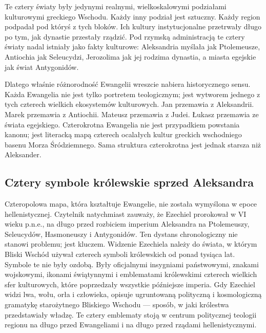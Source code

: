 Te cztery światy były jedynymi realnymi, wielkoskalowymi podziałami kulturowymi greckiego Wschodu.
Każdy inny podział jest sztuczny.
Każdy region podpadał pod któryś z tych bloków.
Ich kultury instytucjonalne przetrwały długo po tym, jak dynastie przestały rządzić.
Pod rzymską administracją te cztery światy nadal istniały jako fakty kulturowe: Aleksandria myślała jak Ptolemeusze, Antiochia jak Seleucydzi, Jerozolima jak jej rodzima dynastia, a miasta egejskie jak świat Antygonidów.

Dlatego właśnie różnorodność Ewangelii wreszcie nabiera historycznego sensu.
Każda Ewangelia nie jest tylko portretem teologicznym; jest wytworem jednego z tych czterech wielkich ekosystemów kulturowych.
Jan przemawia z Aleksandrii.
Marek przemawia z Antiochii.
Mateusz przemawia z Judei.
Łukasz przemawia ze świata egejskiego.
Czterokrotna Ewangelia nie jest przypadkiem powstania kanonu; jest literacką mapą czterech ocalałych kultur greckich wschodniego basenu Morza Śródziemnego.
Sama struktura czterokrotna jest jednak starsza niż Aleksander.

\subsection{Cztery symbole królewskie sprzed Aleksandra}

Czteropolowa mapa, która kształtuje Ewangelie, nie została wymyślona w epoce hellenistycznej.
Czytelnik natychmiast zauważy, że Ezechiel prorokował w VI wieku p.n.e., na długo przed rozbiciem imperium Aleksandra na Ptolemeuszy, Seleucydów, Hasmoneuszy i Antygonidów.
Ten dystans chronologiczny nie stanowi problemu; jest kluczem.
Widzenie Ezechiela należy do świata, w którym Bliski Wschód używał czterech symboli królewskich od ponad tysiąca lat.
Symbole te nie były ozdobą.
Były oficjalnymi insygniami państwowymi, znakami wojskowymi, ikonami świątynnymi i emblematami królewskimi czterech wielkich sfer kulturowych, które poprzedzały wszystkie późniejsze imperia.
Gdy Ezechiel widzi lwa, wołu, orła i człowieka, opisuje ugruntowaną polityczną i kosmologiczną gramatykę starożytnego Bliskiego Wschodu — sposób, w jaki królestwa przedstawiały władzę.
Te cztery emblematy stoją w centrum politycznej teologii regionu na długo przed Ewangeliami i na długo przed rządami hellenistycznymi.

